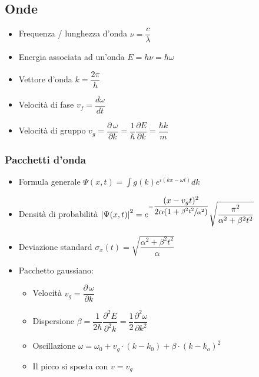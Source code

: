 \documentclass[9pt]{extarticle}
\begin{document}
\subsection{Onde}
\begin{itemize}
  \item Frequenza / lunghezza d'onda \( \nu = \dfrac{c}{\lambda} \)
  \item Energia associata ad un'onda \( E = h \nu = \hbar \omega \)
  \item Vettore d'onda \( k = \dfrac{2 \pi}{h} \)
  \item Velocità di fase \( v_f = \dfrac{d \omega}{d t}\)
  \item Velocità di gruppo \( v_g = \dfrac{\partial \, \omega}{\partial k} = \dfrac{1}{\hbar} \dfrac{\partial E}{\partial k} =\dfrac{\hbar k}{m} \)
\end{itemize}

\subsubsection{Pacchetti d'onda}
\begin{itemize}
  \item Formula generale \( \displaystyle \Psi(x, t) = \int{g(k) e^{i (kx- \omega t)} dk}  \)
  \item Densità di probabilità \( \left| \Psi(x, t) \right| ^ 2 = e ^ {-\dfrac{(x-v_g t) ^ 2}{2 \alpha (1 + \sfrac{\beta^2 t^2}{\alpha^2})}} \sqrt{\dfrac{\pi^2}{\alpha^2 + \beta^2 t^2}} \)
  \item Deviazione standard \( \sigma_x (t) = \sqrt{ \dfrac{\alpha^2 + \beta^2 t^2}{\alpha} } \)
  \item Pacchetto gaussiano:
        \begin{itemize}
          \item Velocità \( v_g = \dfrac{\partial \, \omega}{\partial k} \)
          \item Dispersione \(\beta = \dfrac{1}{2 \hbar} \dfrac{\partial ^ 2 E}{\partial ^ 2 k} = \dfrac{1}{2} \dfrac{\partial ^ 2 \omega}{\partial k ^ 2} \)
          \item Oscillazione \( \omega = \omega_0 + v_g \cdot (k - k_0) + \beta \cdot (k - k_o) ^ 2 \)
          \item Il picco si sposta con \( v = v_g \)
        \end{itemize}
\end{itemize}
\end{document}
